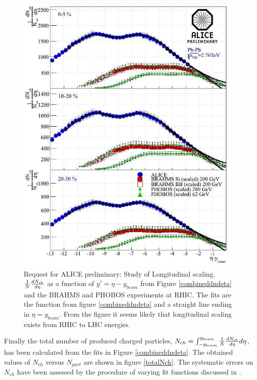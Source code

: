 \documentclass[11pt]{article}
\begin{document}
\begin{figure}
  \centering
  \includegraphics[keepaspectratio,width=\textwidth]{results_PbPblongscaling_sat}
  \caption{Request for ALICE preliminary: Study of Longitudinal
    scaling. $\dndeta$ as a function of $y'=\eta-y_{beam}$ from Figure
    \ref{combineddndeta} and the BRAHMS\cite{Bearden:2001qq} and
    PHOBOS\cite{Alver:2010ck} experiments at RHIC. The fits are the
    function from figure \ref{combineddndeta} and a straight line
    ending in $\eta=y_{beam}$. From the figure it seems likely that
    longitudinal scaling exists from RHIC to LHC energies.}
  \label{longscaling}
\end{figure} 

Finally the total number of produced charged particles,
$N_{ch}=\int^{y_{beam}}_{-y_{beam}}\dndeta d\eta$, has
been calculated from the fits in Figure \ref{combineddndeta}. The
obtained values of $N_{ch}$ versus $N_{part}$ are shown in figure
\ref{totalNch}. The systematic errors on $N_{ch}$ have been assessed
by the procedure of varying fit functions discussed in \cite{maxime}.
\end{document}
